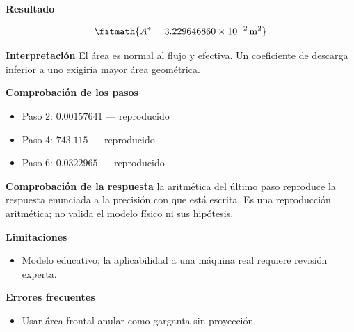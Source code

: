 \documentclass[10pt,openany]{book}
\begin{document}
\begin{tcolorbox}[title={Problema resuelto 1}, studiumworked, breakable]
\noindent\textbf{Resultado}

\[
\fitmath{A^{*}=3.229646860\times10^{-2}\,\mathrm{m}^{2}}
\]

\noindent\textbf{Interpretación}
El área es normal al flujo y efectiva. Un coeficiente de descarga inferior a uno exigiría mayor área geométrica.

\noindent\textbf{Comprobación de los pasos}
\begin{itemize}
\item Paso 2: $0.00157641$ — reproducido
\item Paso 4: $743.115$ — reproducido
\item Paso 6: $0.0322965$ — reproducido
\end{itemize}

\noindent\textbf{Comprobación de la respuesta} la aritmética del último paso reproduce la respuesta enunciada a la precisión con que está escrita. Es una reproducción aritmética; no valida el modelo físico ni sus hipótesis.

\noindent\textbf{Limitaciones}
\begin{itemize}
\item Modelo educativo; la aplicabilidad a una máquina real requiere revisión experta.
\end{itemize}

\noindent\textbf{Errores frecuentes}
\begin{itemize}
\item Usar área frontal anular como garganta sin proyección.
\end{itemize}
\end{tcolorbox}
\end{document}
